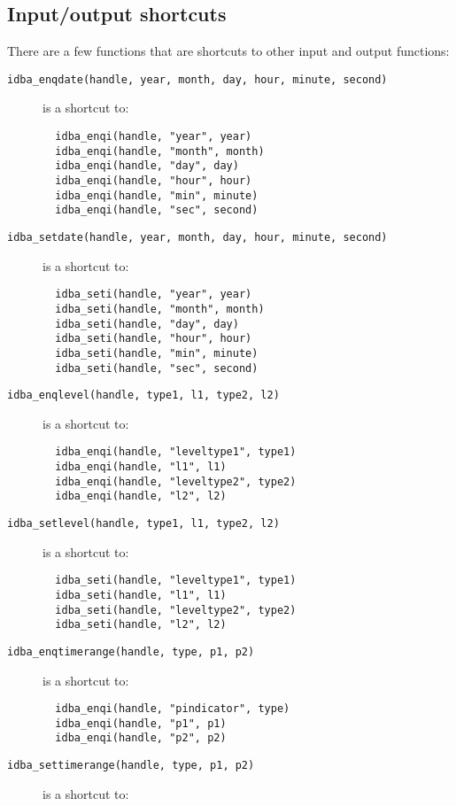 \documentclass[final,12pt,a4paper,twoside]{book}
\begin{document}
\subsection {Input/output shortcuts}

\label{fun-shortcuts}

There are a few functions that are shortcuts to other input and output
functions:

\begin{description}
\item[{\tt idba\_enqdate(handle, year, month, day, hour, minute, second)}]
  is a shortcut to:
  \begin{verbatim}
  idba_enqi(handle, "year", year)
  idba_enqi(handle, "month", month)
  idba_enqi(handle, "day", day)
  idba_enqi(handle, "hour", hour)
  idba_enqi(handle, "min", minute)
  idba_enqi(handle, "sec", second)
  \end{verbatim}
\item[{\tt idba\_setdate(handle, year, month, day, hour, minute, second)}]
  is a shortcut to:
  \begin{verbatim}
  idba_seti(handle, "year", year)
  idba_seti(handle, "month", month)
  idba_seti(handle, "day", day)
  idba_seti(handle, "hour", hour)
  idba_seti(handle, "min", minute)
  idba_seti(handle, "sec", second)
  \end{verbatim}
\item[{\tt idba\_enqlevel(handle, type1, l1, type2, l2)}]
  is a shortcut to:
  \begin{verbatim}
  idba_enqi(handle, "leveltype1", type1)
  idba_enqi(handle, "l1", l1)
  idba_enqi(handle, "leveltype2", type2)
  idba_enqi(handle, "l2", l2)
  \end{verbatim}
\item[{\tt idba\_setlevel(handle, type1, l1, type2, l2)}]
  is a shortcut to:
  \begin{verbatim}
  idba_seti(handle, "leveltype1", type1)
  idba_seti(handle, "l1", l1)
  idba_seti(handle, "leveltype2", type2)
  idba_seti(handle, "l2", l2)
  \end{verbatim}
\item[{\tt idba\_enqtimerange(handle, type, p1, p2)}]
  is a shortcut to:
  \begin{verbatim}
  idba_enqi(handle, "pindicator", type)
  idba_enqi(handle, "p1", p1)
  idba_enqi(handle, "p2", p2)
  \end{verbatim}
\item[{\tt idba\_settimerange(handle, type, p1, p2)}]
  is a shortcut to:
  \begin{verbatim}

\end{verbatim}
\end{description}
\end{document}
